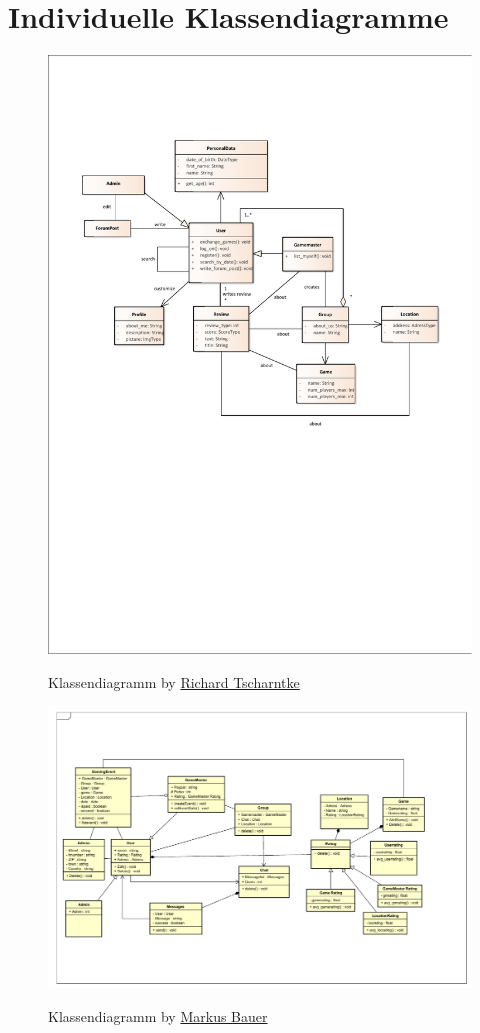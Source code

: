 \section{Individuelle Klassendiagramme}
	\label{app:C_Klassendiagramme}
	\begin{figure}[h!]
		\centering
		\includegraphics[width = \linewidth]{docs/5_Klassendiagramme/Richard/classdiagram_richard.pdf}
		\label{fig:ClassDia_Richard}
		\caption*{Klassendiagramm by \hyperref[person:RichardTscharntke]{Richard Tscharntke}}
	\end{figure}

	\begin{figure}[h!]
		\centering
		\includegraphics[width =\linewidth]{docs/5_Klassendiagramme/Markus/Klassendiagramm.pdf}
		\label{fig:ClassDia_Markus}
		\caption*{Klassendiagramm by \hyperref[person:MarkusBauer]{Markus Bauer}}
	\end{figure}

	